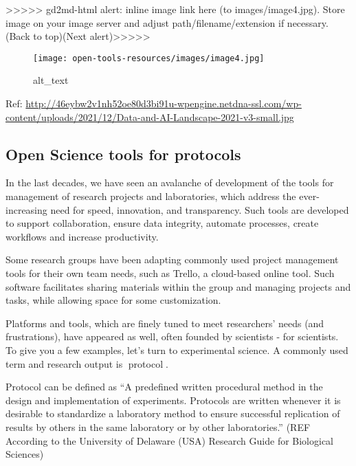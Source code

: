 \documentclass[
  letterpaper,
  DIV=11,
  numbers=noendperiod]{scrreport}
\begin{document}
{\textgreater\textgreater\textgreater\textgreater\textgreater{}
gd2md-html alert: inline image link here (to images/image4.jpg). Store
image on your image server and adjust path/filename/extension if
necessary. }(Back to top)(Next
alert){\textgreater\textgreater\textgreater\textgreater\textgreater{} }

\begin{figure}

{\centering \texttt{[image: open-tools-resources/images/image4.jpg]}

}

\caption{alt\_text}

\end{figure}

Ref:
\url{http://46eybw2v1nh52oe80d3bi91u-wpengine.netdna-ssl.com/wp-content/uploads/2021/12/Data-and-AI-Landscape-2021-v3-small.jpg}

\hypertarget{open-science-tools-for-protocols}{%
\subsection{Open Science tools for
protocols}\label{open-science-tools-for-protocols}}

In the last decades, we have seen an avalanche of development of the
tools for management of research projects and laboratories, which
address the ever-increasing need for speed, innovation, and
transparency. Such tools are developed to support collaboration, ensure
data integrity, automate processes, create workflows and increase
productivity.

Some research groups have been adapting commonly used project management
tools for their own team needs, such as Trello, a cloud-based online
tool. Such software facilitates sharing materials within the group and
managing projects and tasks, while allowing space for some
customization.

Platforms and tools, which are finely tuned to meet researchers' needs
(and frustrations), have appeared as well, often founded by scientists -
for scientists. To give you a few examples, let's turn to experimental
science. A commonly used term and research output is{📖} protocol{📖}.

Protocol can be defined as ``A predefined written procedural method in
the design and implementation of experiments. Protocols are written
whenever it is desirable to standardize a laboratory method to ensure
successful replication of results by others in the same laboratory or by
other laboratories.'' (REF According to the University of Delaware (USA)
Research Guide for Biological Sciences)
\end{document}
